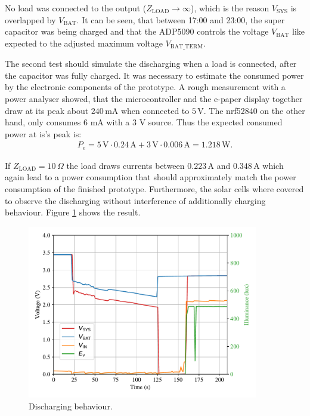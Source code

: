 No load was connected to the output ($Z_\text{LOAD} \to \infty$), which is the reason $V_{\text{SYS}}$ is overlapped by $V_{\text{BAT}}$.
It can be seen, that between 17:00 and 23:00, the super capacitor was being charged and
that the ADP5090 controls the voltage $V_{\text{BAT}}$ like expected to the adjusted maximum voltage $V_{\text{BAT\_TERM}}$.

The second test should simulate the discharging when a load is connected, after the capacitor was fully charged.
It was necessary to estimate the consumed power by the electronic components of the prototype.
A rough measurement with a power analyser showed, that the microcontroller and the e-paper display together draw at its peak about $240\,\text{mA}$ when connected to $5\,\text{V}$. The nrf52840 on the other hand, only consumes 6 mA with a 3 V source. Thus the expected consumed power at is's peak is:
\begin{align}
	P_{e} = 5\,\text{V}\cdot 0.24\,\text{A} + 3\,\text{V}\cdot 0.006\,\text{A} = 1.218\,\text{W}.
\end{align}
  

If $Z_{\text{LOAD}}=10\,\Omega$ the load draws currents between $0.223\,\text{A}$ and $0.348\,\text{A}$ which again lead to a power consumption that should approximately match the power consumption of the finished prototype.
Furthermore, the solar cells where covered to observe the discharging without interference of additionally charging behaviour.
Figure \ref{development:discharge} shows the result.
 
\begin{figure}[ht]
	\centering
	\includegraphics[width=0.9\textwidth]{4-development/hardware/graphics/entladen.pdf}
	\caption{Discharging behaviour.\label{development:discharge}}
\end{figure}

